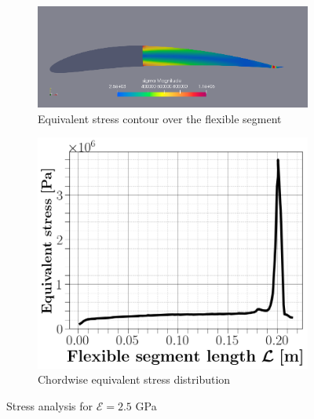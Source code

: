 \documentclass[conf]{new-aiaa}
\begin{document}
%
\begin{figure}[ht!]
\centering
\begin{subfigure}{.4\textwidth}
\includegraphics[width=0.99\columnwidth]{Figures/sigma.png}
\caption{\label{fig:stress} Equivalent stress contour over the flexible segment}
\end{subfigure}
\begin{subfigure}{.3\textwidth}
\includegraphics[width=0.99\columnwidth]{figs/equivalentstress.png}
\caption{Chordwise equivalent stress distribution\label{fig:stress2.5GPa}}
\end{subfigure}
\caption{\label{fig:displ} Stress analysis for $\mathcal{E}= 2.5$ GPa }
\end{figure}
\end{document}
